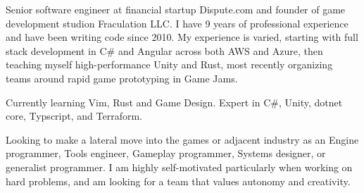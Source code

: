 

\begin{cvparagraph}

Senior software engineer at financial startup Dispute.com and founder of game development studion Fraculation LLC.\@
I have 9 years of professional experience and have been writing code since 2010. My experience is varied, starting with 
full stack development in C\# and Angular across both AWS and Azure, then teaching myself high-performance Unity and Rust,
most recently organizing teams around rapid game prototyping in Game Jams.

Currently learning Vim, Rust and Game Design. Expert in C\#, Unity, dotnet core, Typscript, and Terraform.

Looking to make a lateral move into the games or adjacent industry as an Engine programmer, 
Tools engineer, Gameplay programmer, Systems designer, or generalist programmer.
I am highly self-motivated particularly when working on hard problems, 
and am looking for a team that values autonomy and creativity.

\end{cvparagraph}
